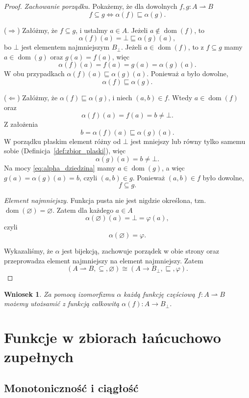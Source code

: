 \documentclass[11pt,a4paper]{article}
\theoremstyle{definition}
\theoremstyle{plain}
\newtheorem{wniosek}[definicja]{Wniosek}
\newcommand{\bt}{\bot}                            %
\newcommand{\dom}{\operatorname{dom}}
\begin{document}
\begin{proof}
	\emph{Zachowanie porządku.} Pokażemy, że dla dowolnych
	$f,g:A\rightharpoonup B$
	\[
	f\subseteq g
	\iff
	\alpha(f)\sqsubseteq\alpha(g).
	\]
	
	($\Rightarrow$) Załóżmy, że $f\subseteq g$, i ustalmy $a\in A$. Jeżeli
	$a\notin\dom(f)$, to
	\[
	\alpha(f)(a)=\bt\sqsubseteq\alpha(g)(a),
	\]
	bo $\bt$ jest elementem najmniejszym $B_\bt$. Jeżeli $a\in\dom(f)$, to
	z $f\subseteq g$ mamy $a\in\dom(g)$ oraz $g(a)=f(a)$, więc
	\[
	\alpha(f)(a)=f(a)=g(a)=\alpha(g)(a).
	\]
	W obu przypadkach $\alpha(f)(a)\sqsubseteq\alpha(g)(a)$. Ponieważ $a$ było
	dowolne,
	\[
	\alpha(f)\sqsubseteq\alpha(g).
	\]
	
	($\Leftarrow$) Załóżmy, że $\alpha(f)\sqsubseteq\alpha(g)$, i niech
	$(a,b)\in f$. Wtedy $a\in\dom(f)$ oraz
	\[
	\alpha(f)(a)=f(a)=b\neq\bt.
	\]
	Z założenia
	\[
	b=\alpha(f)(a)\sqsubseteq\alpha(g)(a).
	\]
	W porządku płaskim element różny od $\bt$ jest mniejszy lub równy tylko
	samemu sobie (Definicja~\ref{def:zbior_plaski}), więc
	\[
	\alpha(g)(a)=b\neq\bt.
	\]
	Na mocy \eqref{eq:alpha_dziedzina} mamy $a\in\dom(g)$, a więc
	$g(a)=\alpha(g)(a)=b$, czyli $(a,b)\in g$. Ponieważ $(a,b)\in f$ było
	dowolne,
	\[
	f\subseteq g.
	\]
	
	\emph{Element najmniejszy.} Funkcja pusta nie jest nigdzie określona,
	tzn.\ $\dom(\varnothing)=\varnothing$. Zatem dla każdego $a\in A$
	\[
	\alpha(\varnothing)(a)=\bt=\varphi(a),
	\]
	czyli
	\[
	\alpha(\varnothing)=\varphi.
	\]
	
	Wykazaliśmy, że $\alpha$ jest bijekcją, zachowuje porządek w obie
	strony oraz przeprowadza element najmniejszy na element najmniejszy.
	Zatem
	\[
	(A\rightharpoonup B,\subseteq,\varnothing)
	\cong
	(A\to B_\bt,\sqsubseteq,\varphi).
	\]
\end{proof}

\begin{wniosek}\label{wn:izomorfizm}
	Za pomocą izomorfizmu $\alpha$ każdą funkcję częściową
	$f:A\rightharpoonup B$ możemy utożsamić z funkcją całkowitą
	$\alpha(f):A\to B_\bt$.
\end{wniosek}

\section{Funkcje w zbiorach łańcuchowo zupełnych}

\subsection{Monotoniczność i ciągłość}
\end{document}
